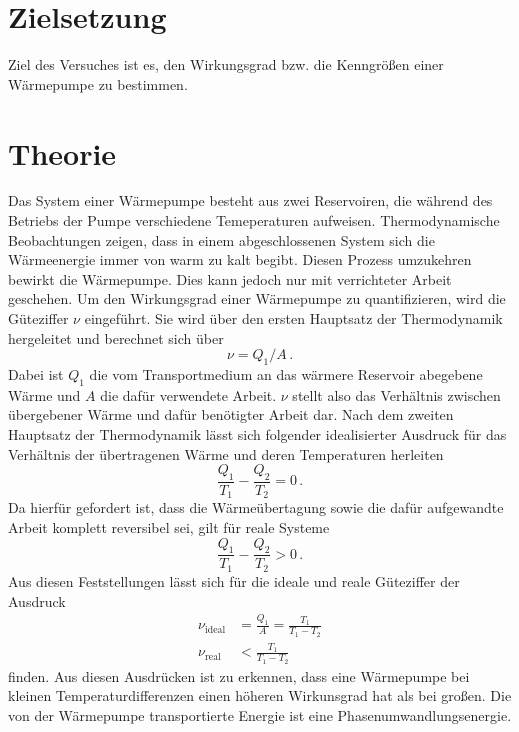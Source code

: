 \section{Zielsetzung}
Ziel des Versuches ist es, den Wirkungsgrad bzw. die Kenngrößen 
einer Wärmepumpe zu bestimmen.
\section{Theorie}
\label{sec:Theorie}

Das System einer Wärmepumpe besteht aus zwei Reservoiren, die 
während des Betriebs der Pumpe verschiedene Temeperaturen aufweisen.
Thermodynamische Beobachtungen zeigen, dass in einem abgeschlossenen 
System sich die Wärmeenergie immer von warm zu kalt begibt. Diesen 
Prozess umzukehren bewirkt die Wärmepumpe. Dies kann jedoch nur mit 
verrichteter Arbeit geschehen. Um den Wirkungsgrad einer Wärmepumpe 
zu quantifizieren, wird die Güteziffer $\nu$ eingeführt. Sie wird 
über den ersten Hauptsatz der Thermodynamik hergeleitet und berechnet 
sich über 
\begin{equation}
    \nu=Q_1/A\,.
\end{equation}
Dabei ist $Q_1$ die vom Transportmedium an das wärmere Reservoir abegebene
Wärme und $A$ die dafür verwendete Arbeit. $\nu$ stellt also das Verhältnis 
zwischen übergebener Wärme und dafür benötigter Arbeit dar. Nach dem zweiten
Hauptsatz der Thermodynamik lässt sich folgender idealisierter Ausdruck für 
das Verhältnis der übertragenen Wärme und deren Temperaturen herleiten 
\begin{equation}
    \frac{Q_1}{T_1}-\frac{Q_2}{T_2}=0\,.
\end{equation}
Da hierfür gefordert ist, dass die Wärmeübertagung sowie die dafür aufgewandte
Arbeit komplett reversibel sei, gilt für reale Systeme 
\begin{equation}
    \frac{Q_1}{T_1}-\frac{Q_2}{T_2}>0\,.
\end{equation}
Aus diesen Feststellungen lässt sich für die ideale und reale Güteziffer der 
Ausdruck 
\begin{align}
    \nu_\text{ideal}&=\frac{Q_1}{A}=\frac{T_1}{T_1-T_2} \label{eq:Gueteideal}\\
    \nu_\text{real}&<\frac{T_1}{T_1-T_2}
\end{align}
finden. Aus diesen Ausdrücken ist zu erkennen, dass eine Wärmepumpe bei kleinen 
Temperaturdifferenzen einen höheren Wirkunsgrad hat als bei großen.
Die von der Wärmepumpe transportierte Energie ist eine Phasenumwandlungsenergie. 
